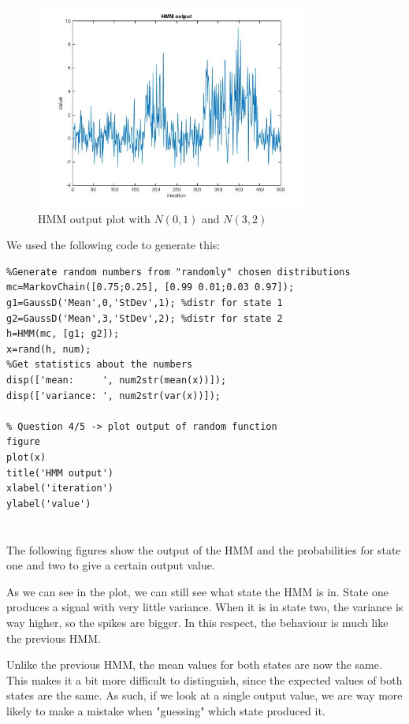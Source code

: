 \begin{figure}[H]
	\caption{HMM output plot with $N(0,1)$ and $N(3,2)$}
	\label{fig:question_4_HMM_plot}
	\centering
	\includegraphics[width=9cm]{images/question_4_HMM_plot}
\end{figure}

We used the following code to generate this:

\begin{verbatim}
%Generate random numbers from "randomly" chosen distributions
mc=MarkovChain([0.75;0.25], [0.99 0.01;0.03 0.97]);
g1=GaussD('Mean',0,'StDev',1); %distr for state 1
g2=GaussD('Mean',3,'StDev',2); %distr for state 2
h=HMM(mc, [g1; g2]);
x=rand(h, num);
%Get statistics about the numbers
disp(['mean:     ', num2str(mean(x))]);
disp(['variance: ', num2str(var(x))]);

% Question 4/5 -> plot output of random function
figure
plot(x)
title('HMM output')
xlabel('iteration')
ylabel('value')
\end{verbatim}

\section{} %
The following figures show the output of the HMM and the probabilities for state one and two to give a certain output value.

As we can see in the plot, we can still see what state the HMM is in. State one produces a signal with very little variance. When it is in state two, the variance is way higher, so the spikes are bigger. In this respect, the behaviour is much like the previous HMM.

Unlike the previous HMM, the mean values for both states are now the same. This makes it a bit more difficult to distinguish, since the expected values of both states are the same. As such, if we look at a single output value, we are way more likely to make a mistake when "guessing" which state produced it.

